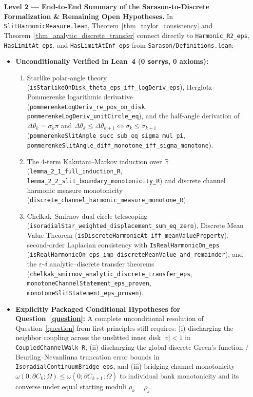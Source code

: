 \documentclass[11pt,reqno]{amsart}
\numberwithin{equation}{section}
\newcommand{\R}{\mathbb{R}}
\newcommand{\eps}{\varepsilon}
\begin{document}
\begin{leveltwo}
\noindent\textbf{\textcolor{l2border}{Level 2 --- End-to-End Summary of the Sarason-to-Discrete Formalization \& Remaining Open Hypotheses.}}
In \texttt{SlitHarmonicMeasure.lean}, Theorem~\ref{thm_taylor_consistency} and Theorem~\ref{thm_analytic_discrete_transfer} connect directly to \texttt{Harmonic\_R2\_eps}, \texttt{HasLimitAt\_eps}, and \texttt{HasLimitAtInf\_eps} from \texttt{Sarason/Definitions.lean}:
\begin{itemize}
\item \textbf{Unconditionally Verified in Lean~4 (0 \texttt{sorry}s, 0 axioms):}
  \begin{enumerate}
  \item Starlike polar-angle theory (\texttt{isStarlikeOnDisk\_theta\_eps\_iff\_logDeriv\_eps}), Herglotz--Pommerenke logarithmic derivative (\texttt{pommerenkeLogDeriv\_re\_pos\_on\_disk}, \texttt{pommerenkeLogDeriv\_unitCircle\_eq}), and the half-angle derivation of $\Delta\theta_k = \sigma_k\pi$ and $\Delta\theta_k \le \Delta\theta_{k+1} \iff \sigma_k \le \sigma_{k+1}$ (\texttt{pommerenkeSlitAngle\_succ\_sub\_eq\_sigma\_mul\_pi}, \texttt{pommerenkeSlitAngle\_diff\_monotone\_iff\_sigma\_monotone}).
  \item The $4$-term Kakutani--Markov induction over $\R$ (\texttt{lemma\_2\_1\_full\_induction\_R}, \texttt{lemma\_2\_2\_slit\_boundary\_monotonicity\_R}) and discrete channel harmonic measure monotonicity (\texttt{discrete\_channel\_harmonic\_measure\_monotone\_R}).
  \item Chelkak--Smirnov dual-circle telescoping (\texttt{isoradialStar\_weighted\_displacement\_sum\_eq\_zero}), Discrete Mean Value Theorem (\texttt{isDiscreteHarmonicAt\_iff\_meanValueProperty}), second-order Laplacian consistency with \texttt{IsRealHarmonicOn\_eps} (\texttt{isRealHarmonicOn\_eps\_imp\_discreteMeanValue\_and\_remainder}), and the $\eps$-$\delta$ analytic--discrete transfer theorems (\texttt{chelkak\_smirnov\_analytic\_discrete\_transfer\_eps}, \texttt{monotoneChannelStatement\_eps\_proven}, \texttt{monotoneSlitStatement\_eps\_proven}).
  \end{enumerate}
\item \textbf{Explicitly Packaged Conditional Hypotheses for Question~\ref{question}:}
  A complete unconditional resolution of Question~\ref{question} from first principles still requires: (i) discharging the neighbor coupling across the unslitted inner disk $|v| < 1$ in \texttt{CoupledChannelWalk\_R}, (ii) discharging the global discrete Green's function / Beurling--Nevanlinna truncation error bounds in \texttt{IsoradialContinuumBridge\_eps}, and (iii) bridging channel monotonicity $\omega(0; \partial C_k; \varOmega) \le \omega(0; \partial C_{k+1}; \varOmega)$ to individual bank monotonicity and its converse under equal starting moduli $\rho_k = \rho_j$.
\end{itemize}
\end{leveltwo}
\end{document}
